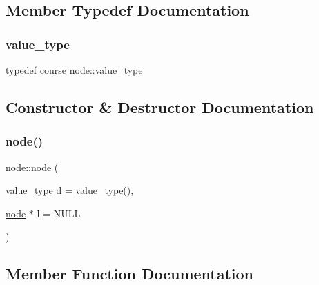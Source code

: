 \begin{DoxyCodeInclude}

\end{DoxyCodeInclude}
 
\begin{DoxyCodeInclude}
\end{DoxyCodeInclude}
 

\subsection{Member Typedef Documentation}
\hypertarget{classnode_af79958a8234d1a3d642adf6637cb9f9b}{}\label{classnode_af79958a8234d1a3d642adf6637cb9f9b} 
\subsubsection{\texorpdfstring{value\+\_\+type}{value\_type}}
{\footnotesize\ttfamily typedef \hyperlink{classcourse}{course} \hyperlink{classnode_af79958a8234d1a3d642adf6637cb9f9b}{node\+::value\+\_\+type}}



\subsection{Constructor \& Destructor Documentation}
\hypertarget{classnode_a4d89d50fbee6842a2588ef0c07063cb8}{}\label{classnode_a4d89d50fbee6842a2588ef0c07063cb8} 
\subsubsection{\texorpdfstring{node()}{node()}}
{\footnotesize\ttfamily node\+::node (\begin{DoxyParamCaption}\item[{\hyperlink{classnode_af79958a8234d1a3d642adf6637cb9f9b}{value\+\_\+type}}]{d = {\ttfamily \hyperlink{classnode_af79958a8234d1a3d642adf6637cb9f9b}{value\+\_\+type}()},  }\item[{\hyperlink{classnode}{node} $\ast$}]{l = {\ttfamily NULL} }\end{DoxyParamCaption})\hspace{0.3cm}{\ttfamily [inline]}}



\subsection{Member Function Documentation}
\hypertarget{classnode_aa608d1caf66b840edfa523ee7825c995}{}\label{classnode_aa608d1caf66b840edfa523ee7825c995} 
